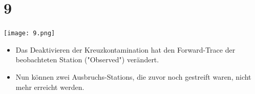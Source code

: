 \documentclass{beamer}
\begin{document}
\section{9}
\begin{frame}
	\begin{center}
  		\texttt{[image: 9.png]}
	\end{center}
	\begin{itemize}
		\item Das Deaktivieren der Kreuzkontamination hat den Forward-Trace der beobachteten Station ("Observed") verändert.
		\item Nun können zwei Ausbruchs-Stations, die zuvor noch gestreift waren, nicht mehr erreicht werden.
	\end{itemize}
\end{frame}
\end{document}
